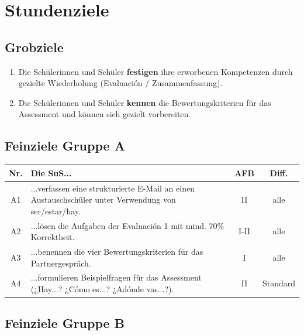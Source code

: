 \documentclass[11pt, a4paper]{article}
\begin{document}

\section{Stundenziele}

\subsection{Grobziele}

\begin{enumerate}[leftmargin=2em]
    \item Die Schülerinnen und Schüler \textbf{festigen} ihre erworbenen Kompetenzen durch gezielte Wiederholung (Evaluación / Zusammenfassung).
    \item Die Schülerinnen und Schüler \textbf{kennen} die Bewertungskriterien für das Assessment und können sich gezielt vorbereiten.
\end{enumerate}

\subsection{Feinziele Gruppe A}

\begin{center}
\small
\begin{tabularx}{\textwidth}{|c|X|c|c|}
    \hline
    \textbf{Nr.} & \textbf{Die SuS...} & \textbf{AFB} & \textbf{Diff.} \\
    \hline
    A1 & ...verfassen eine strukturierte E-Mail an einen Austauschschüler unter Verwendung von ser/estar/hay. & II & alle \\
    \hline
    A2 & ...lösen die Aufgaben der Evaluación 1 mit mind. 70\% Korrektheit. & I-II & alle \\
    \hline
    A3 & ...benennen die vier Bewertungskriterien für das Partnergespräch. & I & alle \\
    \hline
    A4 & ...formulieren Beispielfragen für das Assessment (¿Hay...? ¿Cómo es...? ¿Adónde vas...?). & II & Standard \\
    \hline
\end{tabularx}
\end{center}

\subsection{Feinziele Gruppe B}
\end{document}
